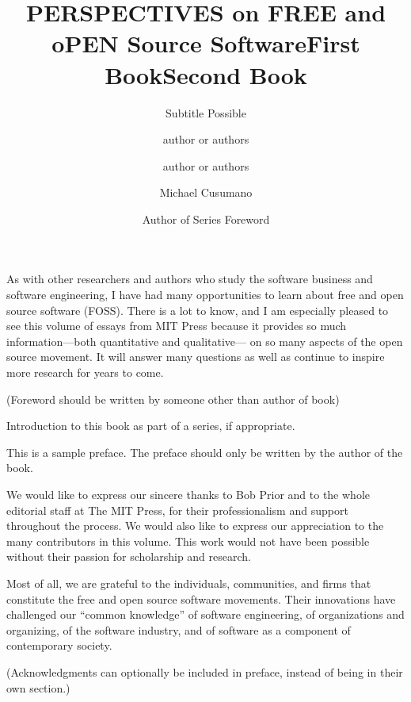 \documentclass{mitpress}
\title{PERSPECTIVES on FREE and oPEN Source Software}
\subtitle{Subtitle Possible}
\title{First Book}
\author{author or authors}
\title{Second Book}
\author{author or authors}
\begin{document}

\titlepages 


\begin{foreword}
\author{Michael Cusumano}

As with other researchers and authors who study the software business
and software engineering, I have had many opportunities to learn about
free and open source software (FOSS). There is a lot to know, and I am
especially pleased to see this volume of essays from MIT Press because
it provides so much information---both quantitative and qualitative---%
on so many aspects of the open source movement. It will answer many
questions as well as continue to inspire more research for years to
come.


(Foreword should be written by someone other than author of book)
\end{foreword}

\begin{seriesforeword}
\author{Author of Series Foreword}

Introduction to this book as part of a series, if appropriate.
\end{seriesforeword}

\begin{preface}
This is a sample preface. The preface should only
be written by the author of the book.

\end{preface}


\begin{acknowledgment}
We would like to express our sincere thanks to Bob Prior and to the whole
editorial staff at The MIT Press, for their professionalism and support
throughout the process. We would also like to express our appreciation to
the many contributors in this volume. This work would not have been possible
without their passion for scholarship and research.

Most of all, we are grateful to the individuals, communities, and firms
that constitute the free and open source software movements. Their innovations
have challenged our ``common knowledge'' of software engineering,
of organizations and organizing, of the software industry, and of
software as a component of contemporary society.


(Acknowledgments can optionally be included in preface, instead of
being in their own section.)
\end{acknowledgment}
\end{document}
